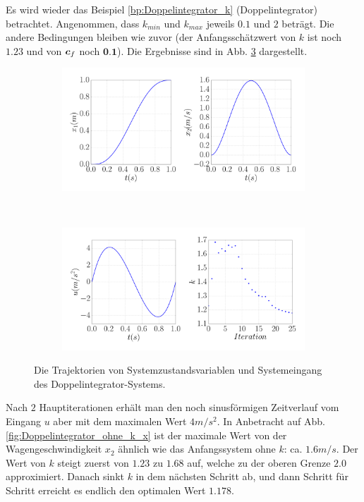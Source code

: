 \begin{beispiel}
	Es wird wieder das Beispiel \ref{bp:Doppelintegrator_k} (Doppelintegrator) betrachtet. Angenommen, dass $k_{min}$ und $k_{max}$ jeweils $0.1$ und $2$ beträgt. Die andere Bedingungen bleiben wie zuvor (der Anfangsschätzwert von $k$ ist noch $1.23$ und von $\boldsymbol c_{f}$ noch $\textbf{0.1}$). Die Ergebnisse sind in Abb. \ref{fig:test0_mit_pe_kmax_2_gesamt} dargestellt.
	
	\begin{figure}[!h]
		\centering
		\begin{subfigure}[c]{\textwidth}
			\centering
			\label{fig:test0_mit_pe_kmax_2_x}
			\includegraphics[width=0.7\linewidth]{bild/30_32/test0_mit_pe_kmax_2_x.pdf}
		\end{subfigure}\\
		\begin{subfigure}[c]{\textwidth}
			\centering
			\label{fig:test0_mit_pe_kmax_2_u}
			\includegraphics[width=0.7\linewidth]{bild/30_32/test0_mit_pe_kmax_2_u.pdf}
		\end{subfigure}
		\caption{Die Trajektorien von Systemzustandsvariablen und Systemeingang des Doppelintegrator-Systems.}
		\label{fig:test0_mit_pe_kmax_2_gesamt}
	\end{figure}
	
	Nach $2$ Hauptiterationen erhält man den noch sinusförmigen Zeitverlauf vom Eingang $u$ aber mit dem maximalen Wert $4m/s^{2}$. In Anbetracht auf Abb. \ref{fig:Doppelintegrator_ohne_k_x} ist der maximale Wert von der Wagengeschwindigkeit $x_{2}$ ähnlich wie das Anfangssystem ohne $k$: ca. $1.6m/s$. Der Wert von $k$ steigt zuerst von $1.23$ zu $1.68$ auf, welche zu der oberen Grenze $2.0$ approximiert. Danach sinkt $k$ in dem nächsten Schritt ab, und dann Schritt für Schritt erreicht es endlich den optimalen Wert $1.178$. 


\end{beispiel}
